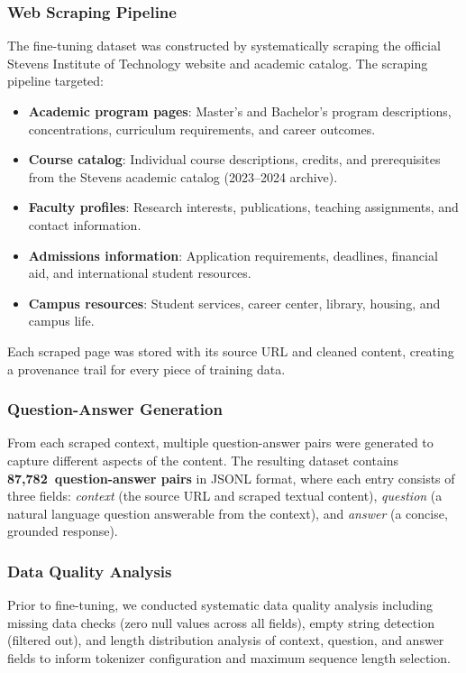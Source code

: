 \documentclass[conference,compsoc]{IEEEtran}
\begin{document}
\subsubsection{Web Scraping Pipeline}

The fine-tuning dataset was constructed by systematically scraping the official Stevens Institute of Technology website and academic catalog. The scraping pipeline targeted:

\begin{itemize}
    \item \textbf{Academic program pages}: Master's and Bachelor's program descriptions, concentrations, curriculum requirements, and career outcomes.
    \item \textbf{Course catalog}: Individual course descriptions, credits, and prerequisites from the Stevens academic catalog (2023--2024 archive).
    \item \textbf{Faculty profiles}: Research interests, publications, teaching assignments, and contact information.
    \item \textbf{Admissions information}: Application requirements, deadlines, financial aid, and international student resources.
    \item \textbf{Campus resources}: Student services, career center, library, housing, and campus life.
\end{itemize}

Each scraped page was stored with its source URL and cleaned content, creating a provenance trail for every piece of training data.

\subsubsection{Question-Answer Generation}

From each scraped context, multiple question-answer pairs were generated to capture different aspects of the content. The resulting dataset contains \textbf{87,782~question-answer pairs} in JSONL format, where each entry consists of three fields: \textit{context} (the source URL and scraped textual content), \textit{question} (a natural language question answerable from the context), and \textit{answer} (a concise, grounded response).

\subsubsection{Data Quality Analysis}

Prior to fine-tuning, we conducted systematic data quality analysis including missing data checks (zero null values across all fields), empty string detection (filtered out), and length distribution analysis of context, question, and answer fields to inform tokenizer configuration and maximum sequence length selection.
\end{document}
